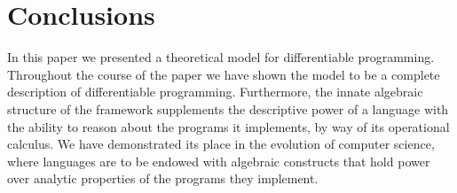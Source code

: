 \section{Conclusions}

In this paper we presented a theoretical model for differentiable programming. Throughout the course of the paper we have shown the model to be a complete description of differentiable programming.
Furthermore, the innate algebraic structure of the framework supplements the descriptive power of a language with the ability to reason about the programs it implements, by way of its operational calculus. We have demonstrated its place in the evolution of computer science, where languages are to be endowed with algebraic constructs that hold power over analytic properties of the programs they implement. 
